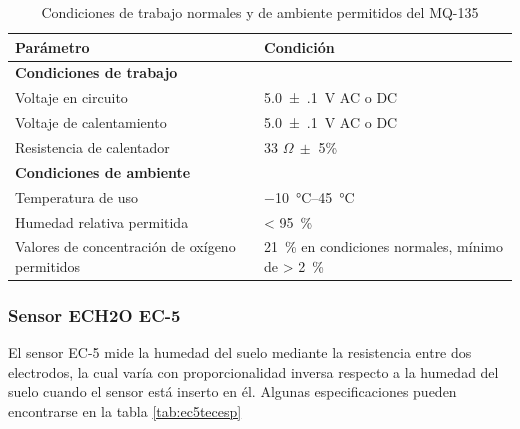 \documentclass[../main]{subfiles}
\begin{document}
\begin{table}[H]
	\centering
	\begin{tabular}{m{6cm} m{6cm}}
		\toprule
		Parámetro                                      & Condición                                                                                      \\
		\midrule
		\textbf{Condiciones de trabajo}                &                                                                                                \\
		Voltaje en circuito                            & \qty{5.0(1)}{\V} AC o DC                                                                       \\
		Voltaje de calentamiento                       & \qty{5.0(1)}{\V} AC o DC                                                                       \\
		Resistencia de calentador                      & 33 $\Omega\ \pm$ 5\%                                                                           \\
		\midrule
		\textbf{Condiciones de ambiente}               &                                                                                                \\
		Temperatura de uso                             & \qtyrange{-10}{45}{\degreeCelsius}                                                             \\
		Humedad relativa permitida                     & \qty[parse-numbers=false]{< 95}{\percent}                                                      \\
		Valores de concentración de oxígeno permitidos & \qty{21}{\percent} en condiciones normales, mínimo de \qty[parse-numbers=false]{> 2}{\percent} \\
		\bottomrule
	\end{tabular}
	\caption{Condiciones de trabajo normales y de ambiente permitidos del MQ-135 \supercite{mq135hanwei}}
	\label{tab:mq135conditions}
\end{table}

\subsubsection{Sensor ECH2O EC-5}

El sensor EC-5 mide la humedad del suelo mediante la resistencia entre dos
electrodos, la cual varía con proporcionalidad inversa respecto a la humedad
del suelo cuando el sensor está inserto en él.
\supercite{ec5humedadsuelosensor}
Algunas especificaciones pueden encontrarse en la tabla \ref{tab:ec5tecesp}
\end{document}
